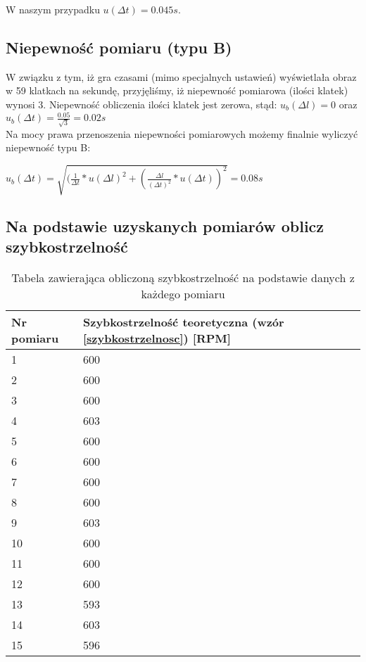 \documentclass[a4paper,12pt]{article}
\begin{document}
\begin{justify}
W naszym przypadku $u(\Delta t) = 0.045s $.

\subsection{Niepewność pomiaru (typu B)}
W związku z tym, iż gra czasami (mimo specjalnych ustawień) wyświetlała obraz w 59 klatkach na sekundę, przyjęliśmy, iż niepewność pomiarowa (ilości klatek) wynosi  3. Niepewność obliczenia ilości klatek jest zerowa, stąd: 
$u_{b}(\Delta l) = 0$ oraz $u_{b}(\Delta t) = \frac{0.05}{\sqrt{3}} = 0.02s$ \\
Na mocy prawa przenoszenia niepewności pomiarowych możemy finalnie wyliczyć niepewność typu B: 

$u_{b}(\Delta t) = \sqrt{(\frac{1}{\Delta t} * u(\Delta l)^2 + (\frac{\Delta l}{(\Delta t)^2} * u(\Delta t))^2} = 0.08s$

\subsection{Na podstawie uzyskanych pomiarów oblicz szybkostrzelność}

\begin{table}[h!]
\begin{center}
\begin{tabular}{|m{3cm}|m{8cm}|}
\hline
Nr pomiaru & Szybkostrzelność teoretyczna (wzór \ref{szybkostrzelnosc}) [RPM] \\
\hline
1 & 600 \\
2 & 600 \\
3 & 600 \\
4 & 603 \\
5 & 600 \\
6 & 600 \\
7 & 600 \\
8 & 600 \\
9 & 603 \\
10 & 600 \\
11 & 600 \\
12 & 600 \\
13 & 593 \\
14 & 603 \\
15 & 596 \\
\hline
\end{tabular}
\caption{Tabela zawierająca obliczoną szybkostrzelność na podstawie danych z każdego pomiaru}
\label{table:2}
\end{center}
\end{table}


\end{justify}
\end{document}
